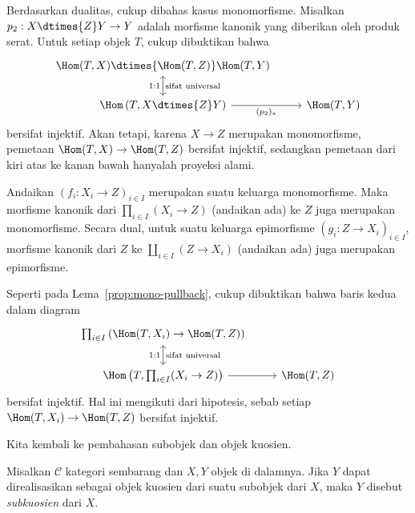 \begin{bukti}
	Berdasarkan dualitas, cukup dibahas kasus monomorfisme. Misalkan
	$p_2: X \dtimes{Z} Y \to Y$ adalah morfisme kanonik yang diberikan oleh
	produk serat. Untuk setiap objek $T$, cukup dibuktikan bahwa
	\[\begin{tikzcd}
		\Hom(T,X) \dtimes{\Hom(T,Z)} \Hom(T,Y) & \\
		\Hom\left(T, X \dtimes{Z} Y \right) \arrow[leftrightarrow, u, "1:1", "\text{sifat universal}"'] \arrow[r, "{(p_2)_*}"'] & \Hom(T, Y)
	\end{tikzcd} \]
	bersifat injektif. Akan tetapi, karena $X \to Z$ merupakan monomorfisme,
	pemetaan $\Hom(T, X) \to \Hom(T, Z)$ bersifat injektif, sedangkan pemetaan
	dari kiri atas ke kanan bawah hanyalah proyeksi alami.
\end{bukti}

\begin{lema}\label{prop:mono-product}
	Andaikan $\left( f_i: X_i \to Z \right)_{i \in I}$ merupakan suatu keluarga
	monomorfisme. Maka morfisme kanonik dari
	$\prod_{i \in I} (X_i \to Z)$ (andaikan ada) ke $Z$ juga merupakan
	monomorfisme. Secara dual, untuk suatu keluarga epimorfisme
	$\left( g_i: Z \to X_i \right)_{i \in I}$, morfisme kanonik dari $Z$ ke
	$\coprod_{i \in I} (Z \to X_i)$ (andaikan ada) juga merupakan
	epimorfisme.
\end{lema}

\begin{bukti}
	Seperti pada Lema~\ref{prop:mono-pullback}, cukup dibuktikan bahwa baris
	kedua dalam diagram
	\[\begin{tikzcd}
		\prod_{i \in I} \left( \Hom(T, X_i) \to \Hom(T, Z) \right) & \\
		\Hom\left(T, \prod_{i \in I} (X_i \to Z) \right) \arrow[leftrightarrow, u, "1:1", "\text{sifat universal}"'] \arrow[r] & \Hom(T, Z)
	\end{tikzcd}\]
	bersifat injektif. Hal ini mengikuti dari hipotesis, sebab setiap
	$\Hom(T, X_i) \to \Hom(T, Z)$ bersifat injektif.
\end{bukti}

Kita kembali ke pembahasan subobjek dan objek kuosien.

\begin{definisi}\label{def:subquotient}
	Misalkan $\mathcal{C}$ kategori sembarang dan $X,Y$ objek di dalamnya. Jika
	$Y$ dapat direalisasikan sebagai objek kuosien dari suatu
	subobjek dari $X$, maka $Y$ disebut \emph{subkuosien} dari $X$.
\end{definisi}

